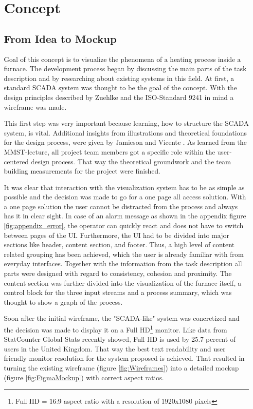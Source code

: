 \section*{Concept}
\subsection*{From Idea to Mockup}

Goal of this concept is to visualize the phenomena of a heating process inside a furnace. The development process began by discussing the main parts of the task description and by researching about existing systems in this field. At first, a standard \ac{SCADA} system was thought to be the goal of the concept. With the design principles described by Zuehlke \cite{Zhlke2012NutzergerechteEV} and the ISO-Standard 9241 \cite{din_9241-110} in mind a wireframe was made.

This first step was very important because learning, how to structure the \ac{SCADA} system, is vital. Additional insights from illustrations and theoretical foundations for the design process, were given by Jamieson \cite{Jamieson2001} and Vicente \cite{Vicente1992}. As learned from the \ac{MMST}-lecture, all project team members got a specific role within the user-centered design process. That way the theoretical groundwork and the team building measurements for the project were finished.

It was clear that interaction with the visualization system has to be as simple as possible and the decision was made to go for a one page all access solution. With a one page solution the user cannot be distracted from the process and always has it in clear sight. In case of an alarm message as shown in the appendix figure \ref{fig:appendix_error}, the operator can quickly react and does not have to switch between pages of the \ac{UI}. Furthermore, the \ac{UI} had to be divided into major sections like header, content section, and footer. Thus, a high level of content related grouping has been achieved, which the user is already familiar with from everyday interfaces. Together with the information from the task description all parts were designed with regard to consistency, cohesion and proximity. The content section was further divided into the visualization of the furnace itself, a control block for the three input streams and a process summary, which was thought to show a graph of the process. 

Soon after the initial wireframe, the "\ac{SCADA}-like" system was concretized and the decision was made to display it on a Full HD\footnote{Full HD = 16:9 aspect ratio with a resolution of 1920x1080 pixels} monitor. Like data from StatCounter Global Stats \cite{statcounterResolution} recently showed, Full-HD is used by 25.7 percent of users in the United Kingdom. That way the best text readability and user friendly monitor resolution for the system proposed is achieved. That resulted in turning the existing wireframe (figure \ref{fig:Wireframes}) into a detailed mockup (figure \ref{fig:FigmaMockup}) with correct aspect ratios.

